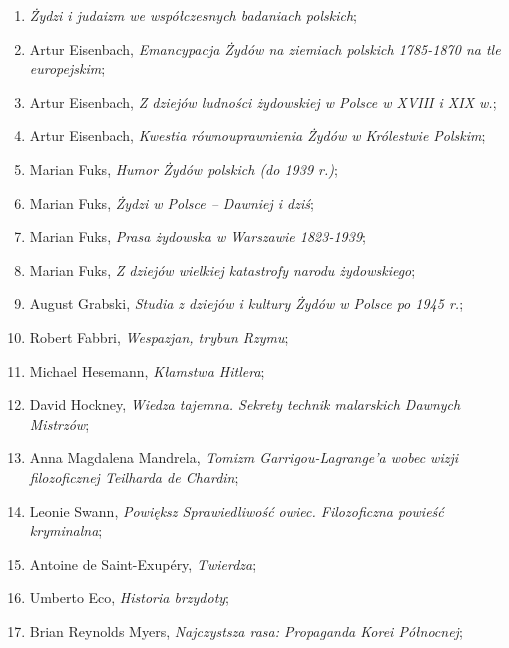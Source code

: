\documentclass[a4paper,11pt]{article}
\begin{document}
\begin{enumerate}
\item \emph{Żydzi i judaizm we współczesnych badaniach polskich};

\item Artur Eisenbach, \emph{Emancypacja Żydów na ziemiach polskich
    1785-1870 na tle europejskim};

\item Artur Eisenbach, \emph{Z dziejów ludności żydowskiej w Polsce w
    XVIII i XIX w.};

\item Artur Eisenbach, \emph{Kwestia równouprawnienia Żydów w
    Królestwie Polskim};

\item Marian Fuks, \emph{Humor Żydów polskich (do 1939 r.)};

\item Marian Fuks, \emph{Żydzi w Polsce – Dawniej i dziś};

\item Marian Fuks, \emph{Prasa żydowska w Warszawie 1823-1939};

\item Marian Fuks, \emph{Z dziejów wielkiej katastrofy narodu
    żydowskiego};

\item August Grabski, \emph{Studia z dziejów i kultury Żydów w Polsce
    po 1945 r.};

\item Robert Fabbri, \emph{Wespazjan, trybun Rzymu};

\item Michael Hesemann, \emph{Kłamstwa Hitlera};

\item David Hockney, \emph{Wiedza tajemna. Sekrety technik malarskich
    Dawnych Mistrzów};

\item Anna Magdalena Mandrela, \emph{Tomizm Garrigou-Lagrange’a wobec
    wizji filozoficznej Teilharda de Chardin};

\item Leonie Swann, \emph{Powiększ Sprawiedliwość owiec. Filozoficzna
    powieść kryminalna};

\item Antoine de Saint-Exupéry, \emph{Twierdza};

\item Umberto Eco, \emph{Historia brzydoty};

\item Brian Reynolds Myers, \emph{Najczystsza rasa: Propaganda Korei
    Północnej};


\end{enumerate}
\end{document}
